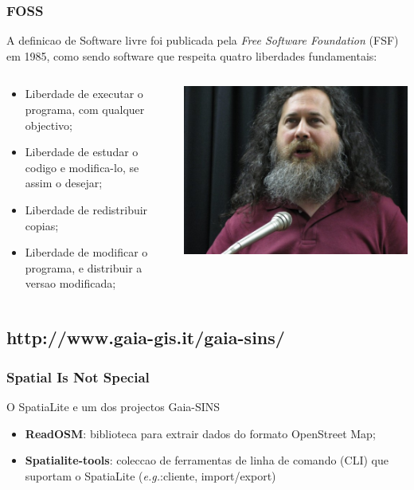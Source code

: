 \documentclass[hyperref={pdfpagelabels=true}]{beamer}
\begin{document}
\begin{frame}
\frametitle{FOSS}
A definicao de Software livre foi publicada pela \textit{Free Software Foundation} (FSF) em 1985, como sendo software que respeita quatro liberdades fundamentais:
\begin{columns}
  \begin{column}{7cm}
    \begin{itemize}
      \item<2-> Liberdade de executar o programa, com qualquer objectivo;
      \item<3-> Liberdade de estudar o codigo e modifica-lo, se assim o desejar;
      \item<4-> Liberdade de redistribuir copias;
      \item<5-> Liberdade de modificar o programa, e distribuir a versao modificada;      
    \end{itemize}    
  \end{column}
  \begin{column}{10cm}
    \includegraphics[scale=0.3]{stallman.jpg}   
  \end{column}  
\end{columns} 
\end{frame}

\subsection{http://www.gaia-gis.it/gaia-sins/}
\begin{frame}
\frametitle{Spatial Is Not Special}
O SpatiaLite e um dos projectos {Gaia-SINS}
    \begin{itemize}
      \item<2-> \textbf{ReadOSM}: biblioteca para extrair dados do formato OpenStreet Map;
      \item<3-> \textbf{Spatialite-tools}: coleccao de ferramentas de linha de comando (CLI) que suportam o SpatiaLite (\textit{e.g.}:cliente, import/export)
    \end{itemize}
\end{frame}
\end{document}

